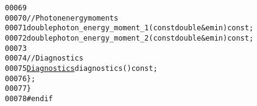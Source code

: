 \begin{footnotesize}
\begin{alltt}
00069 
00070             \textcolor{comment}{// Photon energy moments}
00071             \textcolor{keywordtype}{double} photon\_energy\_moment\_1(\textcolor{keyword}{const} \textcolor{keywordtype}{double} & emin) \textcolor{keyword}{const};
00072             \textcolor{keywordtype}{double} photon\_energy\_moment\_2(\textcolor{keyword}{const} \textcolor{keywordtype}{double} & emin) \textcolor{keyword}{const};
00073 
00074             \textcolor{comment}{// Diagnostics}
00075             \hyperlink{classeos_1_1Diagnostics}{Diagnostics} diagnostics() \textcolor{keyword}{const};
00076     \};
00077 \}
00078 \textcolor{preprocessor}{#endif}
\end{alltt}\end{footnotesize}
